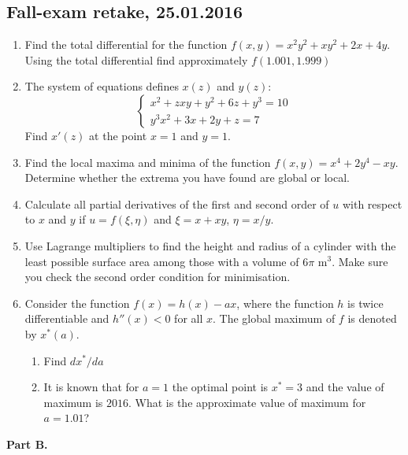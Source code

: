 \documentclass[12pt]{article} %
\theoremstyle{definition} %
\begin{document}
\subsection{Fall-exam retake, 25.01.2016}

\begin{enumerate}

\item Find the total differential for the function $f(x,y)=x^2y^2+xy^2+2x+4y$. Using the total differential find approximately $f(1.001,1.999)$

\item The system of equations defines $x(z)$ and $y(z)$:
\begin{equation}
\begin{cases}
x^2+zxy+y^2+6z+y^3=10 \\
y^3x^2+3x+2y+z=7 \nonumber
\end{cases}
\end{equation}
Find $x'(z)$ at the point $x=1$ and $y=1$.

\item Find the local maxima and minima of the function $f(x,y)=x^4+2y^4-xy$. Determine whether the extrema you have found are global or local.


\item Calculate all partial derivatives of the first and second order of $u$ with respect to $x$ and $y$ if $u=f (\xi, \eta)$ and $\xi=x+xy$, $\eta=x/y$.

\item Use Lagrange multipliers to find the height and radius of a cylinder with the least possible
surface area among those with a volume of $6\pi$ m$^3$. Make sure you check the second order
condition for minimisation.

\item Consider the function $f(x)=h(x)-ax$, where the function $h$ is twice differentiable and $h''(x)<0$ for all $x$. The global maximum of $f$ is denoted by $x^*(a)$.
\begin{enumerate}
\item Find $dx^*/da$
\item It is known that for $a=1$ the optimal point is $x^*=3$ and the value of maximum is $2016$. What is the approximate value of maximum for $a=1.01$?
\end{enumerate}


\end{enumerate}

\textbf{Part B.}
\end{document}
